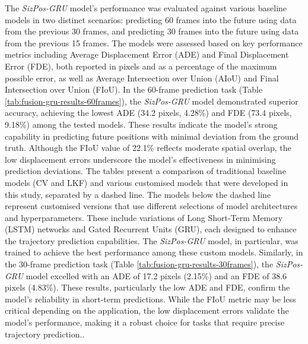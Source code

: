 \documentclass[12pt,oneside]{book} %
\begin{document}
The \textit{SizPos-GRU} model’s performance was evaluated against various
baseline models in two distinct scenarios: predicting 60 frames into the future
using data from the previous 30 frames, and predicting 30 frames into the
future using data from the previous 15 frames. The models were assessed based
on key performance metrics including Average Displacement Error (ADE) and Final
Displacement Error (FDE), both reported in pixels and as a percentage of the
maximum possible error, as well as Average Intersection over Union (AIoU) and
Final Intersection over Union (FIoU). In the 60-frame prediction task (Table
\ref{tab:fusion-gru-results-60frames}), the \textit{SizPos-GRU} model
demonstrated superior accuracy, achieving the lowest ADE (34.2 pixels, 4.28\%)
and FDE (73.4 pixels, 9.18\%) among the tested models. These results indicate
the model’s strong capability in predicting future positions with minimal
deviation from the ground truth. Although the FIoU value of 22.1\% reflects
moderate spatial overlap, the low displacement errors underscore the model’s
effectiveness in minimising prediction deviations. The tables present a
comparison of traditional baseline models (CV and LKF) and various customised
models that were developed in this study, separated by a dashed line. The
models below the dashed line represent customised versions that use different
selections of model architectures and hyperparameters. These include variations
of Long Short-Term Memory (LSTM) networks and Gated Recurrent Units (GRU), each
designed to enhance the trajectory prediction capabilities. The
\textit{SizPos-GRU} model, in particular, was trained to achieve the best
performance among these custom models. Similarly, in the 30-frame prediction
task (Table \ref{tab:fusion-gru-results-30frames}), the \textit{SizPos-GRU}
model excelled with an ADE of 17.2 pixels (2.15\%) and an FDE of 38.6 pixels
(4.83\%). These results, particularly the low ADE and FDE, confirm the model’s
reliability in short-term predictions. While the FIoU metric may be less
critical depending on the application, the low displacement errors validate the
model’s performance, making it a robust choice for tasks that require precise
trajectory prediction..
\end{document}
